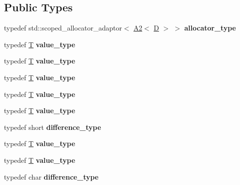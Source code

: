 \subsection*{Public Types}
\begin{DoxyCompactItemize}
\item 
\mbox{\label{struct_d_ad55a7541259f6f08094eddac4213468b}} 
typedef std\+::scoped\+\_\+allocator\+\_\+adaptor$<$ \mbox{\hyperlink{struct_a2}{A2}}$<$ \mbox{\hyperlink{struct_d}{D}} $>$ $>$ {\bfseries allocator\+\_\+type}
\item 
\mbox{\label{struct_d_a13b9b96bf74a52bb97d8a58c6d56275c}} 
typedef \mbox{\hyperlink{struct_t}{T}} {\bfseries value\+\_\+type}
\item 
\mbox{\label{struct_d_a13b9b96bf74a52bb97d8a58c6d56275c}} 
typedef \mbox{\hyperlink{struct_t}{T}} {\bfseries value\+\_\+type}
\item 
\mbox{\label{struct_d_a13b9b96bf74a52bb97d8a58c6d56275c}} 
typedef \mbox{\hyperlink{struct_t}{T}} {\bfseries value\+\_\+type}
\item 
\mbox{\label{struct_d_a13b9b96bf74a52bb97d8a58c6d56275c}} 
typedef \mbox{\hyperlink{struct_t}{T}} {\bfseries value\+\_\+type}
\item 
\mbox{\label{struct_d_a13b9b96bf74a52bb97d8a58c6d56275c}} 
typedef \mbox{\hyperlink{struct_t}{T}} {\bfseries value\+\_\+type}
\item 
\mbox{\label{struct_d_a07b5de08ea2c25d36667564d5b889fef}} 
typedef short {\bfseries difference\+\_\+type}
\item 
\mbox{\label{struct_d_a13b9b96bf74a52bb97d8a58c6d56275c}} 
typedef \mbox{\hyperlink{struct_t}{T}} {\bfseries value\+\_\+type}
\item 
\mbox{\label{struct_d_a13b9b96bf74a52bb97d8a58c6d56275c}} 
typedef \mbox{\hyperlink{struct_t}{T}} {\bfseries value\+\_\+type}
\item 
\mbox{\label{struct_d_a499f6e9a60b93b0ade7a8168e0f8da84}} 
typedef char {\bfseries difference\+\_\+type}
\end{DoxyCompactItemize}
